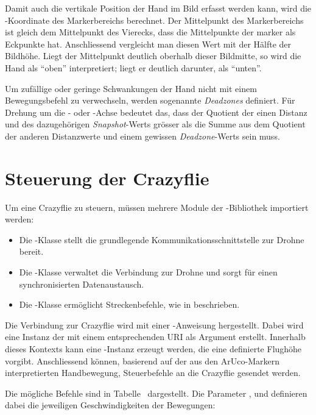 Damit auch die vertikale Position der Hand im Bild erfasst werden kann, wird die -Koordinate des Markerbereichs berechnet.
Der Mittelpunkt des Markerbereichs ist gleich dem Mittelpunkt des Vierecks, dass die Mittelpunkte der marker als Eckpunkte hat.
Anschliessend vergleicht man diesen Wert mit der Hälfte der Bildhöhe.
Liegt der Mittelpunkt deutlich oberhalb dieser Bildmitte, so wird die Hand als \enquote{oben} interpretiert; liegt er deutlich darunter, als \enquote{unten}.

Um zufällige oder geringe Schwankungen der Hand nicht mit einem Bewegungsbefehl zu verwechseln, werden sogenannte \textit{Deadzones} definiert.
Für Drehung um die - oder -Achse bedeutet das, dass der Quotient der einen Distanz und des dazugehörigen \textit{Snapshot}-Werts grösser als die Summe aus dem Quotient der anderen Distanzwerte und einem gewissen \textit{Deadzone}-Werts sein muss.

\section{Steuerung der Crazyflie}
\label{sec:cf_co}
Um eine Crazyflie zu steuern, müssen mehrere Module der -Bibliothek importiert werden:

\begin{itemize}
    \item Die -Klasse stellt die grundlegende Kommunikationsschnittstelle zur Drohne bereit.
    \item Die -Klasse verwaltet die Verbindung zur Drohne und sorgt für einen synchronisierten Datenaustausch.
    \item Die -Klasse ermöglicht Streckenbefehle, wie in  beschrieben.
\end{itemize}

Die Verbindung zur Crazyflie wird mit einer -Anweisung hergestellt.
Dabei wird eine Instanz der  mit einem entsprechenden URI als Argument erstellt.
Innerhalb dieses Kontexts kann eine -Instanz\footnotemark{} erzeugt werden, die eine definierte Flughöhe vorgibt.
Anschliessend können, basierend auf der aus den ArUco-Markern interpretierten Handbewegung, Steuerbefehle an die Crazyflie gesendet werden.

Die mögliche Befehle sind in Tabelle~ dargestellt.
Die Parameter ,  und  definieren dabei die jeweiligen Geschwindigkeiten der Bewegungen:

